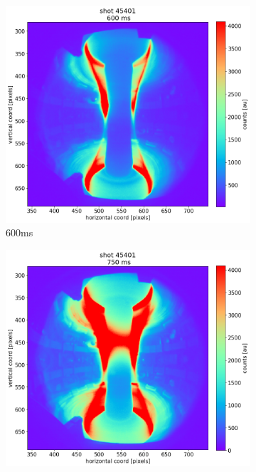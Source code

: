 \begin{figure}[!ht]
    \centering
    \begin{subfigure}{0.3\linewidth}
         \centering
         \includegraphics[trim={60 0 120 60},clip,width=\textwidth]{Chapters/chapter2/figs/45473_for_paper_600ms.png}
         \caption{600ms}
         \label{fig:mu01_tomo4a}
    \end{subfigure}
    \begin{subfigure}{0.3\linewidth}
         \centering
         \includegraphics[trim={60 0 120 60},clip,width=\textwidth]{Chapters/chapter2/figs/45473_for_paper_750ms.png}

\end{subfigure}
\end{figure}
